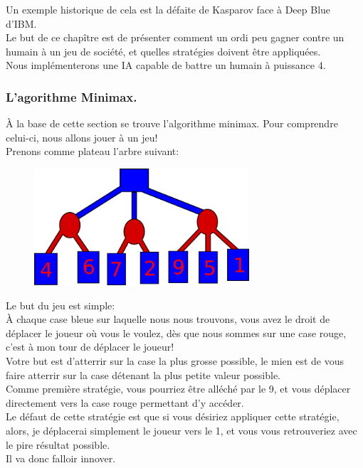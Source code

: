 \documentclass[a4paper, 12pt]{article}
\numberwithin{equation}{subsection}
\begin{document}
Un exemple historique de cela est la défaite de Kasparov face à Deep Blue d'IBM.\\

Le but de ce chapître est de présenter comment un ordi peu gagner contre un humain à un jeu de société, et quelles stratégies doivent être appliquées.\\

Nous implémenterons une IA capable de battre un humain à puissance 4.\\
\subsubsection{L'agorithme Minimax.}
À la base de cette section se trouve l'algorithme minimax. Pour comprendre celui-ci, nous allons jouer à un jeu!\\
Prenons comme plateau l'arbre suivant:
\begin{figure}[H]
  \centering
  \includegraphics[width=8.0cm]{imgs/minimax_start.png}
\end{figure}
Le but du jeu est simple: \\

À chaque case bleue sur laquelle nous nous trouvons, vous avez le droit de déplacer le joueur où vous le voulez, dès que nous sommes sur une case rouge, c'est à mon tour de déplacer le joueur!\\

Votre but est d'atterrir sur la case la plus grosse possible, le mien est de vous faire atterrir sur la case détenant la plus petite valeur possible.\\

Comme première stratégie, vous pourriez être alléché par le 9, et vous déplacer directement vers la case rouge permettant d'y accéder. \\

Le défaut de cette stratégie est que si vous désiriez appliquer cette stratégie, alors, je déplacerai simplement le joueur vers le 1, et vous vous retrouveriez avec le pire résultat possible.\\
Il va donc falloir innover.\\
\end{document}
